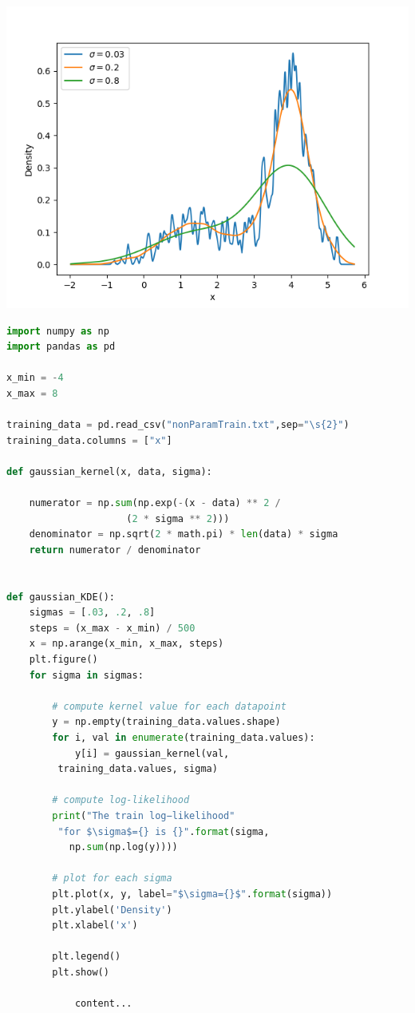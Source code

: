 \documentclass[12pt]{article}
\begin{document}
\begin{section}
\begin{subsection}
		\includegraphics[scale=.7]{./KDE}
		
		\begin{lstlisting}[language=python,frame=single]
import numpy as np
import pandas as pd

x_min = -4
x_max = 8

training_data = pd.read_csv("nonParamTrain.txt",sep="\s{2}")
training_data.columns = ["x"]
		
def gaussian_kernel(x, data, sigma):

	numerator = np.sum(np.exp(-(x - data) ** 2 /
					 (2 * sigma ** 2)))
	denominator = np.sqrt(2 * math.pi) * len(data) * sigma
	return numerator / denominator
		
		
def gaussian_KDE():
	sigmas = [.03, .2, .8]
	steps = (x_max - x_min) / 500
	x = np.arange(x_min, x_max, steps)
	plt.figure()
	for sigma in sigmas:
		
		# compute kernel value for each datapoint
		y = np.empty(training_data.values.shape)
		for i, val in enumerate(training_data.values):
			y[i] = gaussian_kernel(val,
		 training_data.values, sigma)
		
		# compute log-likelihood
		print("The train log−likelihood"
		 "for $\sigma$={} is {}".format(sigma,
		   np.sum(np.log(y))))
		
		# plot for each sigma
		plt.plot(x, y, label="$\sigma={}$".format(sigma))
		plt.ylabel('Density')
		plt.xlabel('x')
		
		plt.legend()
		plt.show()
		
			content...
		\end{lstlisting}
		
	\end{subsection}
\end{section}
 
\end{document}

